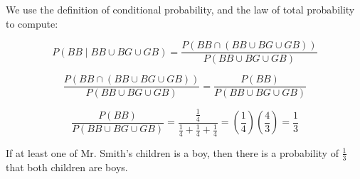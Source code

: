 \documentclass[a4paper,11pt]{article}
\begin{document}
We use the definition of conditional probability, and the law of total
probability to compute:

\begin{equation}
P \left( BB \mid BB \cup BG \cup GB \right) 
= \frac{ P \left( BB \cap \left( BB \cup BG \cup GB \right) \right) }
  { P \left( BB \cup BG \cup GB \right) }
\end{equation}

\begin{equation}
\frac{ P \left( BB \cap \left( BB \cup BG \cup GB \right) \right) }
  { P \left( BB \cup BG \cup GB \right) }
= \frac{ P \left( BB \right)}
  { P \left( BB \cup BG \cup GB \right) }
\end{equation}

\begin{equation}
 \frac{ P \left( BB \right)}
  { P \left( BB \cup BG \cup GB \right) }
= \frac{ \frac{ 1}{4} }
  { \frac{1}{4} + \frac{1}{4} + \frac{1}{4}}
= \left( \frac{1}{4} \right) \left( \frac{4}{3} \right)
= \frac{1}{3}
\end{equation}

If at least one of Mr. Smith's children is a boy, then there is a 
probability of $\frac{1}{3}$ that both children are boys.
\printbibliography{}
\end{document}
